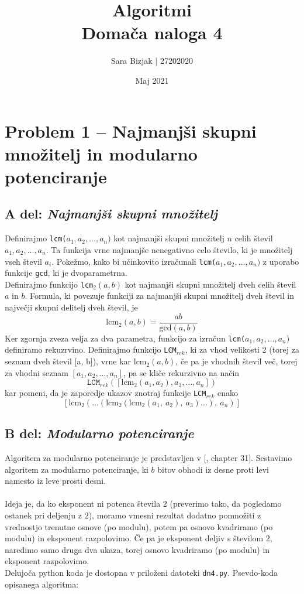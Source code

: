 \documentclass[a4paper,11pt]{article}
\title{Algoritmi \\
\textbf{Domača naloga 4} }
\author{Sara Bizjak  |  27202020}
\date{Maj 2021}
\begin{document}
\maketitle


\section*{Problem 1 -- Najmanjši skupni množitelj in modularno potenciranje}

\subsection*{A del: \textit{Najmanjši skupni množitelj}}

Definirajmo \texttt{lcm($a_1, a_2, \ldots, a_n)$} kot najmanjši skupni množitelj $n$ celih števil $a_1, a_2, \ldots, a_n$. Ta funkcija vrne najmanjše nenegativno celo število, ki je množitelj vseh števil $a_i$. 
Pokežmo, kako bi učinkovito izračunali  \texttt{lcm($a_1, a_2, \ldots, a_n)$}  z uporabo funkcije \texttt{gcd}, ki je dvoparametrna.
\\
Definirajmo funkcijo \texttt{lcm$_2(a, b)$} kot najmanjši skupni množitelj dveh celih števil $a$ in $b$.
Formula, ki povezuje funkciji za najmanjši skupni množitelj dveh števil in največji skupni delitelj dveh števil, je
$$
\text{lcm}_2(a, b) = \frac{ab}{\text{gcd}(a, b)}
$$
Ker zgornja zveza velja za dva parametra, funkcijo za izračun \texttt{lcm($a_1, a_2, \ldots, a_n)$} definiramo rekuzrvino. 
Definirajmo funkcijo \texttt{LCM$_{rek}$}, ki za vhod velikosti 2 (torej za seznam dveh števil [a, b]), vrne kar $\text{lcm}_2(a, b)$, če pa je vhodnih števil več, torej za vhodni seznam $[a_1, a_2, \ldots, a_n]$, pa se kliče rekurzivno na način
$$
\texttt{LCM$_{rek}$}([\text{lcm}_2(a_1, a_2), a_3, \ldots, a_n])
$$
kar pomeni, da je zaporedje ukazov znotraj funkcije \texttt{LCM$_{rek}$} enako
$$
[\text{lcm}_2( \ldots (\text{lcm}_2(\text{lcm}_2(a_1, \ a_2), \ a_3) \ldots), \ a_n)]
$$
\subsection*{B del: \textit{Modularno potenciranje}}
Algoritem za modularno potenciranje je predstavljen v [\cite{vir}, chapter 31]. Sestavimo algoritem za modularno potenciranje, ki $b$ bitov obhodi iz desne proti levi namesto iz leve prosti desni.
\\
\\
Ideja je, da ko eksponent ni potenca števila $2$ (preverimo tako, da pogledamo ostanek pri deljenju z $2$), 
moramo vmesni rezultat dodatno pomnožiti z vrednostjo trenutne osnove (po modulu), potem pa osnovo kvadriramo (po modulu) in eksponent razpolovimo. 
Če pa je eksponent deljiv s številom $2$, naredimo samo druga dva ukaza, torej osnovo kvadriramo (po modulu) in eksponent razpolovimo.
\\
Delujoča python koda je dostopna v priloženi datoteki \texttt{dn4.py}. Psevdo-koda opisanega algoritma:
\end{document}
